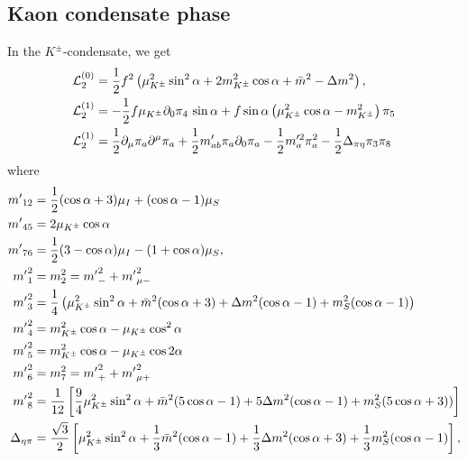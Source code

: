 \subsection{Kaon condensate phase}

In the $K^\pm$-condensate, we get
%
\begin{align}
    \label{static three-flavor lagrangian kaon condensate}
    \mathcal{L}^{(0)}_2 
    & =
    \frac{1}{2}f^2 
    \left(
        \mu_{K^\pm}^2 \sin^2\alpha
        + 2m^2_{K^\pm} \cos\alpha
        + \bar m^2 - \Delta m^2
    \right), \\
    \label{linear three-flavor lagrangian kaon condensate}
    \mathcal{L}_2^{(1)}
    & 
    =
    - \frac{1}{2}f\mu_{K^\pm}\partial_0\pi_4 \, \sin\alpha 
    + f\sin\alpha
    \left(
        \mu_{K^\pm}^2 \cos\alpha
        -m_{K^\pm}^2
    \right)\pi_5\\
    \label{quadratic three-flavor lagrangian kaon condensate}
    \mathcal{L}_2^{(1)}
    & =
    \frac{1}{2} \partial_\mu \pi_a \partial^\mu \pi_a
    + \frac{1}{2}m'_{ab} \pi_a\partial_0\pi_a
    - \frac{1}{2}m'^2_{a} \pi_a^2
    - \frac{1}{2}\Delta_{\pi\eta} \pi_3\pi_8
\end{align}
%
where
%
\begingroup
\allowdisplaybreaks
\begin{align}
    {m'}_{12} &= \frac{1}{2}(\cos\alpha + 3)\mu_I + (\cos\alpha - 1)\mu_S \\
    {m'}_{45} &= 2\mu_{K^\pm}\cos\alpha \\
    {m'}_{76} &= \frac{1}{2}(3-\cos\alpha) \mu_I - (1 + \cos\alpha)\mu_S, \\
    {m'}_1^2 & = m_2^2 = {m'}_-^2 + {m'}_{\mu-}^2\\
    {m'}_3^2 
    & = 
    \frac{1}{4}
    \left(
        \mu_{K^\pm}^2 \sin^2\alpha
        + \bar m^2(\cos\alpha + 3)
        + \Delta m^2 (\cos\alpha -1)
        + m_S^2(\cos\alpha - 1)
    \right)\\
    {m'}_4^2 & = m_{K^\pm}^2\cos\alpha -\mu_{K^\pm} \cos^2\alpha \\
    {m'}_5^2 & = m_{K^\pm}^2\cos\alpha -\mu_{K^\pm} \cos 2\alpha \\
    {m'}_6^2 & = m_7^2 = {m'}_+^2 + {m'}_{\mu+}^2\\
    {m'}_8^2
    & =
    \frac{1}{12}
    \left[
        \frac{9}{4}\mu_{K^\pm}^2\sin^2\alpha
        + \bar m^2(5\cos\alpha-1) 
        + 5\Delta m^2(\cos\alpha-1)
        + m_S^2(5\cos\alpha+3))
    \right] \\
    \Delta_{\eta\pi}
    & =
    \frac{\sqrt{3}}{2}
    \left[
        \mu_{K^\pm}^2\sin^2\alpha
        + \frac{1}{3}\bar m^2(\cos\alpha - 1)
        + \frac{1}{3}\Delta m^2(\cos\alpha + 3)
        + \frac{1}{3}m^2_S(\cos\alpha - 1)
    \right],
\end{align}
